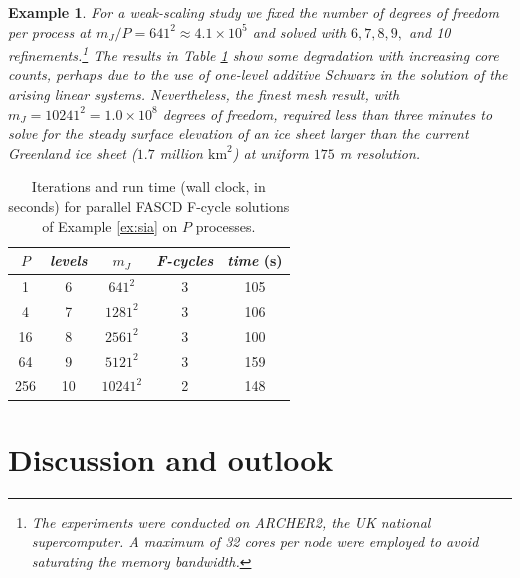 \documentclass[letterpaper,final,12pt,reqno]{amsart}
\theoremstyle{cstyle}
\theoremstyle{cstyle*}
\theoremstyle{dstyle}
\newtheorem{example}[theorem]{Example}
\numberwithin{equation}{section}
\numberwithin{figure}{section}
\numberwithin{table}{section}
\numberwithin{theorem}{section}
\begin{document}
\begin{example}
For a weak-scaling study we fixed the number of degrees of freedom per process at $m_J/P=641^2 \approx 4.1 \times 10^5$ and solved with $6, 7, 8, 9, $ and 10 refinements.\footnote{The experiments were conducted on ARCHER2, the UK national supercomputer. A maximum of 32 cores per node were employed to avoid saturating the memory bandwidth.}  The results in Table \ref{tab:results:siaweak} show some degradation with increasing core counts, perhaps due to the use of one-level additive Schwarz in the solution of the arising linear systems. Nevertheless, the finest mesh result, with $m_J=10241^2=1.0 \times 10^8$ degrees of freedom, required less than three minutes to solve for the steady surface elevation of an ice sheet larger than the current Greenland ice sheet ($1.7$ million $\text{km}^2$) at uniform $175$ m resolution.
\end{example}

\begin{table}[ht]
\begin{tabular}{c@{\hskip 4mm}c@{\hskip 4mm}c@{\hskip 7mm}c@{\hskip 4mm}c}
\toprule
$P$ & \emph{levels} & $m_J$ & \emph{F-cycles} & \emph{time} (s) \\ \cmidrule{1-5}
\midrule
 1 & 6 & $641^2$ & 3 & 105 \\
 4 & 7 & $1281^2$ & 3 & 106 \\
 16 & 8 & $2561^2$ & 3 & 100 \\
 64 & 9 & $5121^2$ & 3 & 159 \\
 256 & 10 & $10241^2$ & 2 & 148 \\
 \bottomrule
\end{tabular}
\bigskip
\caption{Iterations and run time (wall clock, in seconds) for parallel FASCD F-cycle solutions of Example \ref{ex:sia} on $P$ processes.}
\label{tab:results:siaweak}
\end{table}

\section{Discussion and outlook} \label{sec:discussion}
\end{document}

